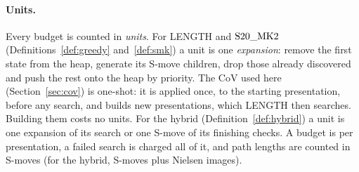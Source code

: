 \paragraph{Units.} Every budget is counted in \emph{units}. For LENGTH and $\mathrm{S20\_MK2}$ (Definitions~\ref{def:greedy}
and~\ref{def:smk}) a unit is one \emph{expansion}: remove the first state from the heap, generate its S-move children,
drop those already discovered and push the rest onto the heap by priority. The CoV used here (Section~\ref{sec:cov}) is
one-shot: it is applied once, to the starting presentation, before any search, and builds new presentations, which
LENGTH then searches. Building them costs no units. For the hybrid (Definition~\ref{def:hybrid}) a unit is one
expansion of its search or one S-move of its finishing checks. A budget is per
presentation, a failed search is charged all of it, and path lengths are counted in S-moves (for the hybrid, S-moves plus Nielsen images).


